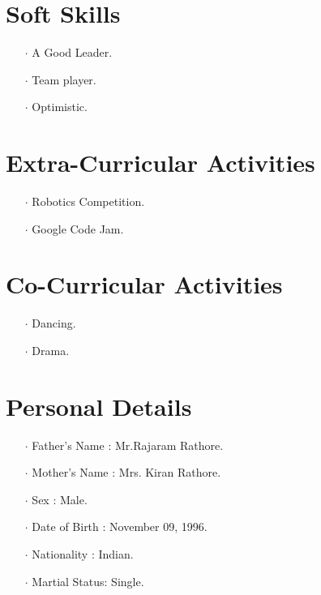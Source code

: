 \documentclass[12pt]{article}
\begin{document}
\section*{Soft Skills}
\begin{itemize}
\item[$\cdot$] A Good Leader.
\item[$\cdot$] Team player.
\item[$\cdot$] Optimistic. 
\end{itemize}
\section*{Extra-Curricular Activities}
\begin{itemize}
\item[$\cdot$] Robotics Competition.
\item[$\cdot$] Google Code Jam.
\end{itemize}
\section*{Co-Curricular Activities}
\begin{itemize} 
\item[$\cdot$] Dancing.
\item[$\cdot$] Drama. 
\end{itemize}
\section*{Personal Details}
\begin{itemize}
\item[$\cdot$]Father's Name : Mr.Rajaram Rathore.
\item[$\cdot$]Mother's Name : Mrs. Kiran Rathore.
\item[$\cdot$]Sex           : Male.
\item[$\cdot$]Date of Birth : November 09, 1996.
\item[$\cdot$]Nationality   : Indian.
\item[$\cdot$]Martial Status: Single.
\end{itemize}
\end{document}
